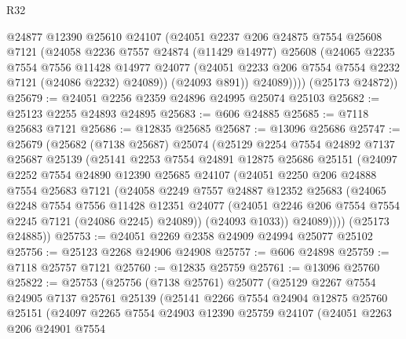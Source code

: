 \begin{lexlean}{R32}
\begin{coremodule}
            @24877
            @12390
            @25610
            @24107
            (@24051
              @2237
              @206
              @24875
              @7554
              @25608
              @7121
              (@24058
                @2236
                @7557
                @24874
                (@11429 @14977)
                @25608
                (@24065
                  @2235
                  @7554
                  @7556
                  @11428
                  @14977
                  @24077
                  (@24051 @2233 @206 @7554 @7554 @2232 @7121 (@24086 @2232) @24089))
                (@24093 @891))
              @24089))))
      (@25173 @24872))
@25679 := @24051 @2256 @2359 @24896 @24995 @25074 @25103
@25682 := @25123 @2255 @24893 @24895
@25683 := @606 @24885
@25685 := @7118 @25683 @7121
@25686 := @12835 @25685
@25687 := @13096 @25686
@25747 := @25679
    (@25682
      (@7138 @25687)
      @25074
      (@25129
        @2254
        @7554
        @24892
        @7137
        @25687
        @25139
        (@25141
          @2253
          @7554
          @24891
          @12875
          @25686
          @25151
          (@24097
            @2252
            @7554
            @24890
            @12390
            @25685
            @24107
            (@24051
              @2250
              @206
              @24888
              @7554
              @25683
              @7121
              (@24058
                @2249
                @7557
                @24887
                @12352
                @25683
                (@24065
                  @2248
                  @7554
                  @7556
                  @11428
                  @12351
                  @24077
                  (@24051 @2246 @206 @7554 @7554 @2245 @7121 (@24086 @2245) @24089))
                (@24093 @1033))
              @24089))))
      (@25173 @24885))
@25753 := @24051 @2269 @2358 @24909 @24994 @25077 @25102
@25756 := @25123 @2268 @24906 @24908
@25757 := @606 @24898
@25759 := @7118 @25757 @7121
@25760 := @12835 @25759
@25761 := @13096 @25760
@25822 := @25753
    (@25756
      (@7138 @25761)
      @25077
      (@25129
        @2267
        @7554
        @24905
        @7137
        @25761
        @25139
        (@25141
          @2266
          @7554
          @24904
          @12875
          @25760
          @25151
          (@24097
            @2265
            @7554
            @24903
            @12390
            @25759
            @24107
            (@24051
              @2263
              @206
              @24901
              @7554

\end{coremodule}
\end{lexlean}
